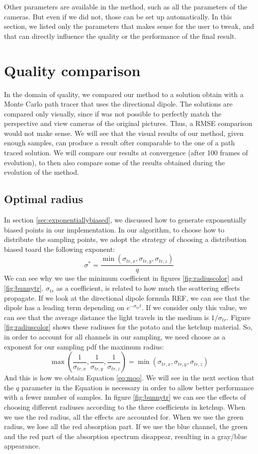 Other parameters are available in the method, such as all the parameters of the cameras. But even if we did not, those can be set up automatically. In this section, we listed only the parameters that makes sense for the user to tweak, and that can directly influence the quality or the performance of the final result.

\section{Quality comparison}

In the domain of quality, we compared our method to a solution obtain with a Monte Carlo path tracer that uses the directional dipole. The solutions are compared only visually, since if was not possible to perfectly match the perspective and view cameras of the original pictures. Thus, a RMSE comparison would not make sense.  We will see that the visual results of our method, given enough samples, can produce a result ofter comparable to the one of a path traced solution. We will compare our results at convergence (after 100 frames of evolution), to then also compare some of the results obtained during the evolution of the method. 

\subsection{Optimal radius}
\label{sec:radius}
In section \ref{sec:exponentiallybiased}, we discussed how to generate exponentially biased points in our implementation. In our algorithm, to choose how to distribute the sampling points, we adopt the strategy of choosing a distribution biased toard the following exponent:
$$
\sigma^* = \frac{\min(\sigma_{tr,x},\sigma_{tr,y},\sigma_{tr,z})}{q}
\label{eq:moo}
$$
We can see why we use the minimum coefficient in figures \ref{fig:radiuscolor} and \ref{fig:bunnytr}. $\sigma_{tr}$ as a coefficient, is related to how much the scattering effects propagate. If we look at the directional dipole formula REF, we can see that the dipole has a leading term depending on $e^{-\sigma_{tr} t}$. If we consider only this value, we can see that the average distance the light travels in the medium is $1/\sigma_{tr}$. Figure \ref{fig:radiuscolor} shows these radiuses for the potato and the ketchup material. So, in order to account for all channels in our sampling, we need choose as a exponent for our sampling pdf the maximum radius:
$$
\max\left(\frac{1}{\sigma_{tr,x}},\frac{1}{\sigma_{tr,y}},\frac{1}{\sigma_{tr,z}}\right) = \min(\sigma_{tr,x},\sigma_{tr,y},\sigma_{tr,z})
$$
And this is how we obtain Equation \ref{eq:moo}. We will see in the next section that the $q$ parameter in the Equation is necessary in order to allow better performance with a fewer number of samples. In figure \ref{fig:bunnytr} we can see the effects of choosing different radiuses according to the three coefficients in ketchup. When we use the red radius, all the effects are accounted for. When we use the green radius, we lose all the red absorption part. If we use the blue channel, the green and the red part of the absorption spectrum disappear, resulting in a gray/blue appearance.

